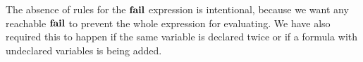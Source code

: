\begin{center}
\begin{minipage}[t]{0.45\textwidth}
  \begin{prooftree}
  \end{prooftree}
\end{minipage}
\begin{minipage}[t]{0.45\textwidth}
  \begin{prooftree}
  \end{prooftree}
\end{minipage}
\end{center}

\bigskip

\begin{prooftree}
\end{prooftree}

\bigskip

\begin{prooftree}
\end{prooftree}

\bigskip

\begin{prooftree}
\end{prooftree}

\bigskip

\begin{prooftree}
\end{prooftree}

\bigskip

The absence of rules for the $\failE$ expression is intentional, because we
want any reachable $\failE$ to prevent the whole expression for evaluating.
We have also required this to happen if the same variable is declared twice
or if a formula with undeclared variables is being added.

